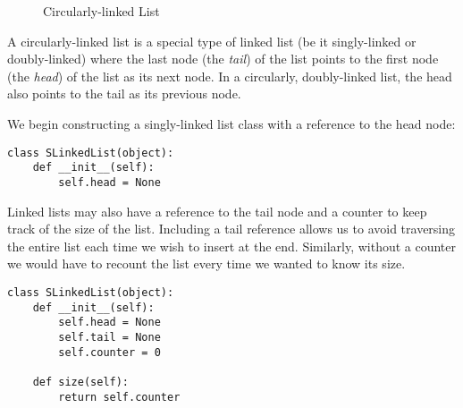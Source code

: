 \begin{figure}[h]
\centering
{}
\caption{Circularly-linked List}
\end{figure}
A circularly-linked list is a special type of linked list (be it singly-linked or doubly-linked) where the last node (the \emph{tail}) of the list points to the first node (the \emph{head}) of the list as its next node.
In a circularly, doubly-linked list, the head also points to the tail as its previous node.

We begin constructing a singly-linked list class with a reference to the head node:
\begin{lstlisting}
class SLinkedList(object):
    def __init__(self):
        self.head = None
\end{lstlisting}

Linked lists may also have a reference to the tail node and a counter to keep track of the size of the list.
Including a tail reference allows us to avoid traversing the entire list each time we wish to insert at the end.
Similarly, without a counter we would have to recount the list every time we wanted to know its size.
\begin{lstlisting}
class SLinkedList(object):
    def __init__(self):
        self.head = None
        self.tail = None
        self.counter = 0

    def size(self):
        return self.counter
\end{lstlisting}

